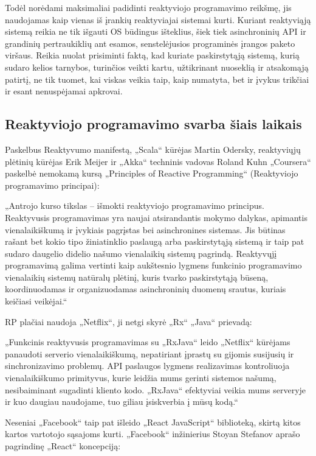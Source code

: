 Todėl norėdami maksimaliai padidinti reaktyviojo programavimo reikšmę, jis naudojamas kaip vienas iš įrankių reaktyviajai sistemai kurti. Kuriant reaktyviąją sistemą reikia ne tik išgauti OS būdingus išteklius, šiek tiek asinchroninių API ir grandinių pertraukiklių ant esamos, senstelėjusios programinės įrangos paketo viršaus. Reikia nuolat prisiminti faktą, kad kuriate paskirstytąją sistemą, kurią sudaro kelios tarnybos, turinčios veikti kartu, užtikrinant nuoseklią ir atsakomąją patirtį, ne tik tuomet, kai viskas veikia taip, kaip numatyta, bet ir įvykus trikčiai ir esant nenuspėjamai apkrovai.

\subsection{Reaktyviojo programavimo svarba šiais laikais}

Paskelbus Reaktyvumo manifestą, „Scala“ kūrėjas Martin Odersky, reaktyviųjų plėtinių kūrėjas Erik Meijer ir „Akka“ techninis vadovas Roland Kuhn „Coursera“ paskelbė nemokamą kursą „Principles of Reactive Programming“ (Reaktyviojo programavimo principai):

„Antrojo kurso tikslas – išmokti reaktyviojo programavimo principus. Reaktyvusis programavimas yra naujai atsirandantis mokymo dalykas, apimantis vienalaikiškumą ir įvykiais pagrįstas bei asinchronines sistemas. Jis būtinas rašant bet kokio tipo žiniatinklio paslaugą arba paskirstytąją sistemą ir taip pat sudaro daugelio didelio našumo vienalaikių sistemų pagrindą. Reaktyvųjį programavimą galima vertinti kaip aukštesnio lygmens funkcinio programavimo vienalaikių sistemų natūralų plėtinį, kuris tvarko paskirstytąją būseną, koordinuodamas ir organizuodamas asinchroninių duomenų srautus, kuriais keičiasi veikėjai.“

RP plačiai naudoja „Netflix“, ji netgi skyrė „Rx“ „Java“ prievadą:

„Funkcinis reaktyvusis programavimas su „RxJava“ leido „Netflix“ kūrėjams panaudoti serverio vienalaikiškumą, nepatiriant įprastų su gijomis susijusių ir sinchronizavimo problemų. API paslaugos lygmens realizavimas kontroliuoja vienalaikiškumo primityvus, kurie leidžia mums gerinti sistemos našumą, nesibaiminant sugadinti kliento kodo. „RxJava“ efektyviai veikia mums serveryje ir kuo daugiau naudojame, tuo giliau įsiskverbia į mūsų kodą.“

Neseniai „Facebook“ taip pat išleido „React JavaScript“ biblioteką, skirtą kitos kartos vartotojo sąsajoms kurti. „Facebook“ inžinierius Stoyan Stefanov aprašo pagrindinę „React“ koncepciją:

